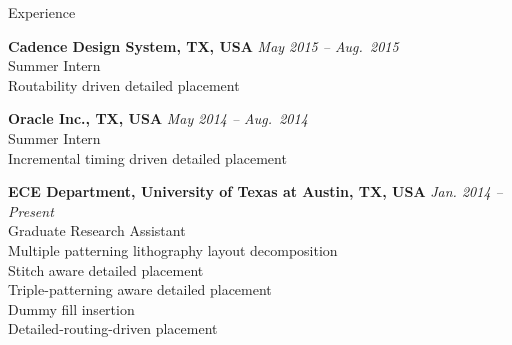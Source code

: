 
\begin{rSection}{Experience}

{\bf Cadence Design System, TX, USA}                           \hfill {\em May 2015 -- Aug.~2015} \\
Summer Intern \\
Routability driven detailed placement

{\bf Oracle Inc., TX, USA}                           \hfill {\em May 2014 -- Aug.~2014} \\
Summer Intern \\
Incremental timing driven detailed placement

{\bf ECE Department, University of Texas at Austin, TX, USA}  \hfill {\em Jan. 2014 -- Present} \\
Graduate Research Assistant \\
Multiple patterning lithography layout decomposition \\ %
Stitch aware detailed placement \\ %
Triple-patterning aware detailed placement \\ %
Dummy fill insertion \\ %
Detailed-routing-driven placement  %

\end{rSection}


